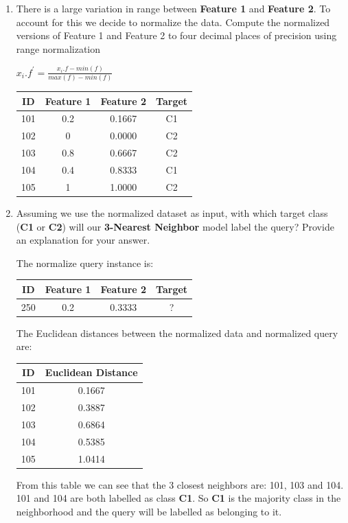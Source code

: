 \documentclass[--SOLUTION-OPTION--]{ditpaper}
\begin{document}
\begin{enumerate}
\begin{enumerate}
\begin{answer}
				\end{answer}
			\item There is a large variation in range between \textbf{Feature 1} and \textbf{Feature 2}. To account for this we decide to normalize the data. Compute the normalized versions of Feature 1 and Feature 2  to four decimal places of precision using range normalization 
								\begin{center}
								$x_i.f^\prime=\frac{x_i.f - min(f)}{max(f)-min(f)}$
								\end{center}		
				\begin{answer}
					\begin{center}
\begin{tabular}{|c|c|c|c|}
\hline
ID & Feature 1 & Feature 2  & Target \\
\hline
101 &	0.2 &	 0.1667 &	C1\\
102 &	0    & 	0.0000 &	C2\\
103 &	0.8 & 	0.6667 &	C2\\
104 &	0.4 &	   0.8333 &	C1\\
105 &	1    & 	1.0000 &	C2\\
\hline
\end{tabular}
					\end{center}
				\end{answer}
			\item Assuming we use the normalized dataset as input, with which target class (\textbf{C1}  or \textbf{C2}) will our \textbf{3-Nearest Neighbor} model label the query? Provide an explanation for your answer.				
				\begin{answer}
					The normalize query instance is:
\begin{center}
\begin{tabular}{|c|c|c|c|}
\hline
ID & Feature 1 & Feature 
2  & Target \\
\hline
250 & 0.2 & 0.3333 & ?\\
\hline
\end{tabular}
\end{center}
				The Euclidean distances between the normalized data and normalized query are: 
					\begin{center}
						\begin{tabular}{|c|c|}
						ID & Euclidean Distance \\
						\hline
101	& 0.1667\\
102	& 0.3887\\
103	& 0.6864\\
104	& 0.5385\\
105	&1.0414\\						
\hline
						\end{tabular}
					\end{center}
From this table we can see that the 3 closest neighbors are: 101, 103 and 104. 101 and 104 are both labelled as class \textbf{C1}. So \textbf{C1} is the majority class in the neighborhood and the query will be labelled as belonging to it.					
				\end{answer}	
		\end{enumerate}
		

\end{enumerate}
\end{document}
